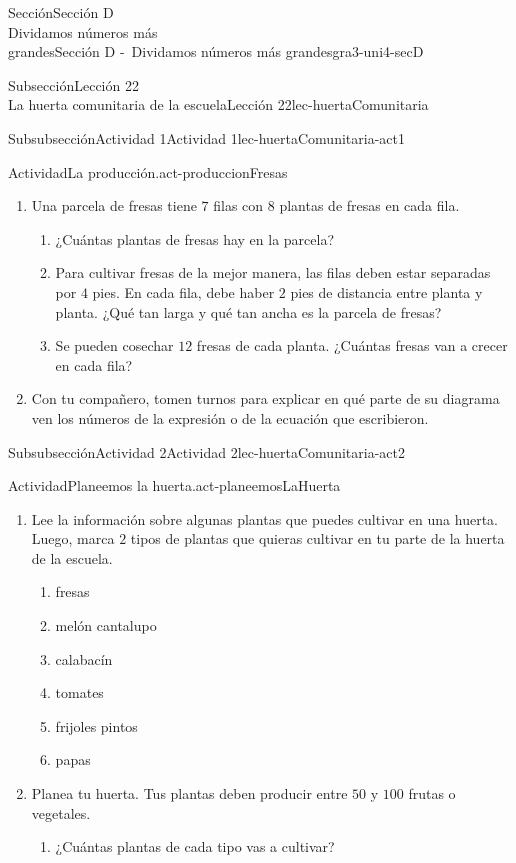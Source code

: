 \begin{sectionptx}{Sección}{{\Large Sección D\\}Dividamos números más\\grandes}{}{Sección D -~Dividamos números más grandes}{}{}{gra3-uni4-secD}
\begin{subsectionptx}{Subsección}{{\normalsize Lección 22\\[-0.05cm]}La huerta comunitaria de la escuela}{}{Lección 22}{}{}{lec-huertaComunitaria}
\begin{subsubsectionptx}{Subsubsección}{Actividad 1}{}{Actividad 1}{}{}{lec-huertaComunitaria-act1}
\begin{activity}{Actividad}{La producción.}{act-produccionFresas}
\begin{enumerate}
\item{}Una parcela de fresas tiene \(7\) filas con \(8\) plantas de fresas en cada fila.%
%
\begin{enumerate}
\item{}¿Cuántas plantas de fresas hay en la parcela?%
\item{}Para cultivar fresas de la mejor manera, las filas deben estar separadas por \(4\) pies. En cada fila, debe haber \(2\) pies de distancia entre planta y planta. ¿Qué tan larga y qué tan ancha es la parcela de fresas?%
\item{}Se pueden cosechar \(12\) fresas de cada planta. ¿Cuántas fresas van a crecer en cada fila?%
\end{enumerate}
\item{}Con tu compañero, tomen turnos para explicar en qué parte de su diagrama ven los números de la expresión o de la ecuación que escribieron.%
\end{enumerate}
\end{activity}%
%
\end{subsubsectionptx}
%
%
\typeout{************************************************}
\typeout{************************************************}
%
\begin{subsubsectionptx}{Subsubsección}{Actividad 2}{}{Actividad 2}{}{}{lec-huertaComunitaria-act2}
\begin{activity}{Actividad}{Planeemos la huerta.}{act-planeemosLaHuerta}%
%
\begin{enumerate}
\item{}Lee la información sobre algunas plantas que puedes cultivar en una huerta. Luego, marca \(2\) tipos de plantas que quieras cultivar en tu parte de la huerta de la escuela.%
%
\begin{enumerate}
\item{}fresas%
\item{}melón cantalupo%
\item{}calabacín%
\item{}tomates%
\item{}frijoles pintos%
\item{}papas%
\end{enumerate}
\item{}Planea tu huerta. Tus plantas deben producir entre \(50\) y \(100\) frutas o vegetales.%
%
\begin{enumerate}
\item{}¿Cuántas plantas de cada tipo vas a cultivar?%

\end{enumerate}
\end{enumerate}
\end{activity}
\end{subsubsectionptx}
\end{subsectionptx}
\end{sectionptx}
